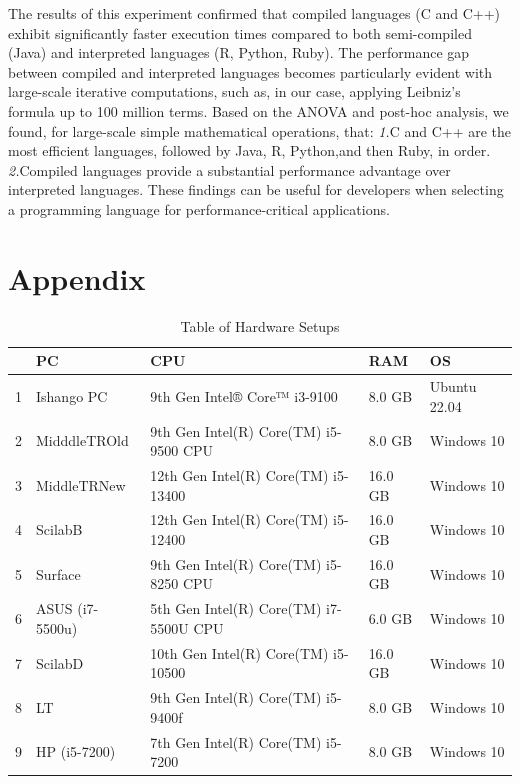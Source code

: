 \documentclass[12pt,halfline,a4paper,]{ouparticle}
\begin{document}
The results of this experiment confirmed that compiled languages (C and
C++) exhibit significantly faster execution times compared to both
semi-compiled (Java) and interpreted languages (R, Python, Ruby). The
performance gap between compiled and interpreted languages becomes
particularly evident with large-scale iterative computations, such as,
in our case, applying Leibniz's formula up to 100 million terms. Based
on the ANOVA and post-hoc analysis, we found, for large-scale simple
mathematical operations, that: \emph{1.}C and C++ are the most efficient
languages, followed by Java, R, Python,and then Ruby, in order.
\emph{2.}Compiled languages provide a substantial performance advantage
over interpreted languages. These findings can be useful for developers
when selecting a programming language for performance-critical
applications. \newpage

\section{Appendix}\label{appendix}

\begin{table}[ht]
\centering
\begin{tabular}{rllll}
  \hline
 & PC & CPU & RAM & OS \\ 
  \hline
1 & Ishango PC &  9th Gen Intel® Core™ i3-9100  &  8.0 GB  & Ubuntu 22.04 \\ 
  2 & MidddleTROld &  9th Gen Intel(R) Core(TM) i5-9500 CPU  &  8.0 GB  &   Windows 10 \\ 
  3 & MiddleTRNew  &  12th Gen Intel(R) Core(TM) i5-13400  &  16.0 GB  &   Windows 10 \\ 
  4 & ScilabB  &   12th Gen Intel(R) Core(TM) i5-12400  &   16.0 GB   &   Windows 10 \\ 
  5 & Surface  &   9th Gen Intel(R) Core(TM) i5-8250 CPU  &   16.0 GB   &   Windows 10 \\ 
  6 & ASUS (i7-5500u)  &   5th Gen Intel(R) Core(TM) i7-5500U CPU  &   6.0 GB   &   Windows 10 \\ 
  7 & ScilabD  &   10th Gen Intel(R) Core(TM) i5-10500  &   16.0 GB   &   Windows 10 \\ 
  8 & LT  &   9th Gen Intel(R) Core(TM) i5-9400f  &   8.0 GB   &   Windows 10 \\ 
  9 & HP (i5-7200)  &   7th Gen Intel(R) Core(TM) i5-7200  &   8.0 GB   &   Windows 10 \\ 
   \hline
\end{tabular}
\caption{Table of Hardware Setups} 
\end{table}
\end{document}
